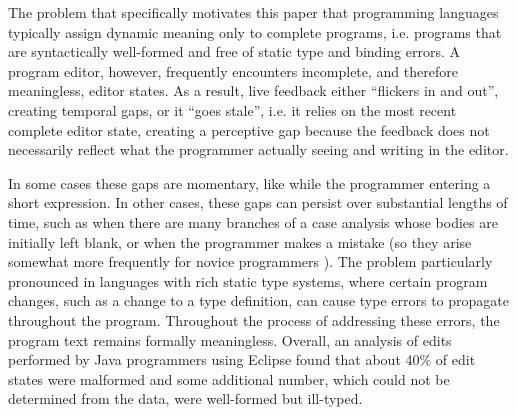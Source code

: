 The problem that specifically motivates this paper \IS that programming languages typically assign dynamic meaning only to {complete programs}, i.e. programs that are syntactically well-formed and free of static type and binding errors. A program editor, however, frequently encounters incomplete, and therefore meaningless, editor states. As a result, live feedback either ``flickers in and out'', creating temporal gaps, or it ``goes stale'', i.e. it relies on the most recent complete editor state, creating a perceptive gap because the feedback does not necessarily reflect what the programmer \IS actually seeing and writing in the editor.

In some cases these gaps are momentary, like while the programmer \IS entering a short expression. In other cases, these gaps can persist over substantial lengths of time, such as when there are many branches of a case analysis whose bodies are initially left blank, or when the programmer makes a mistake (so they arise somewhat more frequently for novice programmers \cite{mccauley2008debugging,fitzgerald2008debugging}). The problem \IS particularly pronounced in languages with rich static type systems, where certain program changes, such as a change to a type definition, can cause type errors to propagate throughout the program. Throughout the process of addressing these errors, the program text remains formally meaningless. 
Overall, an analysis of edits performed by Java programmers using Eclipse found that about 40\% of edit states were malformed \cite{popl-paper,6883030} and some additional number, which could not be determined from the data, were well-formed but ill-typed.



